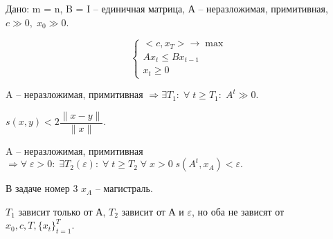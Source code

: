 \begin{problem}
	Дано: m = n, B = I -- единичная матрица, А -- неразложимая, примитивная, $c \gg 0, \; x_0 \gg 0$. 

	$$\begin{cases}
		<c, x_T> \to \max\\
		Ax_t \leq B x_{t - 1}\\
		x_t \geq 0
	\end{cases}$$ 
\end{problem}

\begin{lemma}
	A -- неразложимая, примитивная $\Rightarrow \exists T_1: \; \forall \; t \geq T_1: \; A^t \gg 0.$
\end{lemma}

\begin{lemma}
	$s(x, y) < 2\dfrac{\| x - y\|}{\| x\|}.$
\end{lemma}

\begin{lemma}
	A -- неразложимая, примитивная $\Rightarrow \forall \; \varepsilon > 0: \; \exists T_2(\varepsilon): \; \forall \; t \geq T_2 \; \forall \; x > 0 \; s(A^t, x_A) < \varepsilon.$
\end{lemma}

\begin{theorem}
	В задаче номер 3 $x_A$ -- магистраль.
\end{theorem}

\begin{remark}
	$T_1$ зависит только от А, $T_2$ зависит от А и $\varepsilon$, но оба не зависят от $x_0, c, T, \{ x_t\}_{t = 1}^T.$
\end{remark}